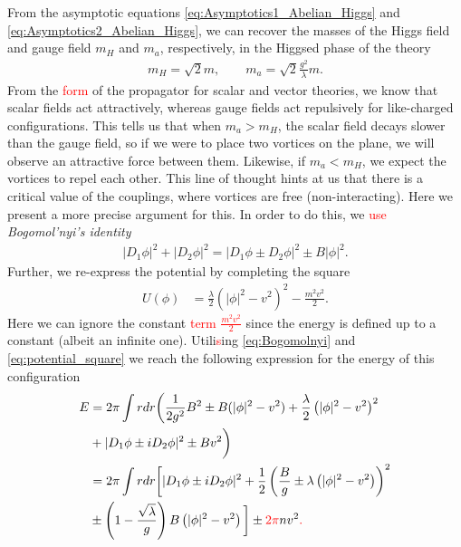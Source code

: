     From the asymptotic equations \eqref{eq:Asymptotics1_Abelian_Higgs} and \eqref{eq:Asymptotics2_Abelian_Higgs}, we can recover the masses of the Higgs field and gauge field $m_{H}$ and $m_a$, respectively, in the Higgsed phase of the theory 
    \begin{align}
        m_{H}= \sqrt{2} m, \qquad m_a = \sqrt{2} \frac{g^2}{\lambda}m .
    \end{align}
    From the \textcolor{red}{form} of the propagator for scalar and vector theories, we know that scalar fields act attractively, whereas gauge fields act repulsively for like-charged configurations. This tells us that when $m_a>m_H$, the scalar field decays slower than the gauge field, so if we were to place two vortices on the plane, we will observe an attractive force between them. Likewise, if  $m_a<m_H$, we expect the vortices to repel each other. This line of thought hints at us that there is a critical value of the couplings, where vortices are free (non-interacting). Here we present a more precise argument for this. In order to do this, we \colorbox{red}{ } \textcolor{red}{use} \textit{Bogomol'nyi's identity}
    \begin{align}
        |D_1 \phi|^2 + |D_2 \phi|^2 = |D_1 \phi \pm D_2 \phi|^2 \pm B |\phi|^2. \label{eq:Bogomolnyi}
    \end{align}
    Further, we re-express the potential by completing the square
    \begin{align}
        U(\phi)&=\frac{\lambda}{2} \left( |\phi|^2 - v^2 \right)^2 - \frac{m^2 v^2}{2}. \label{eq:potential_square}
    \end{align}
    Here we can ignore the constant \textcolor{red}{term $\frac{m^2 v^2}{2}$} since the energy is defined up to a constant (albeit an infinite one). Utili\textcolor{red}{s}ing \eqref{eq:Bogomolnyi} and \eqref{eq:potential_square} we reach the following expression for the energy of this configuration
    \begin{align}
        E &= 2 \pi \int r dr \bigg(\frac{1}{2 g^2}B^2 \pm B(|\phi|^2 -v^2) + \frac{\lambda}{2} \left(|\phi|^2 -v^2 \right)^2  \nonumber \\
        &+ |D_1\phi \pm i D_2 \phi|^2 \pm B v^2 \bigg) \label{eq:BPS_Energy_Higgs_Vortex_Background1}\\ 
        &= 2 \pi \int r dr \bigg[|D_1\phi \pm i D_2 \phi|^2 +\frac{1}{2}\left( \frac{B}{g} \pm \lambda \left(|\phi|^2 -v^2  \right) \right)^2   \nonumber\\ 
        &\pm \left(1 - \frac{\sqrt{\lambda}}{g} \right) B \left(|\phi|^2 - v^2 \right) \bigg] \pm \textcolor{red}{2\pi} n v^2\textcolor{red}{.} \label{eq:BPS_Energy_Higgs_Vortex_Background2}
    \end{align}
